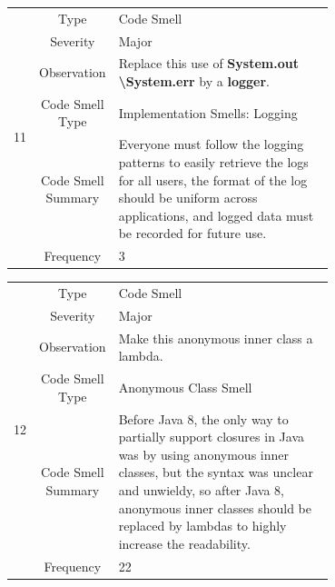\documentclass[12pt,letterpaper]{report}
\begin{document}
\begin{table}
    \begin{tabular}{|c|c|p{0.7\linewidth}|}
    \hline   
    \multirow{6}{*}{11}
        & Type & Code Smell \\
    \cline{2-3}
        & Severity & Major \\
    \cline{2-3}
       & Observation & Replace this use of \textbf{System.out \textbackslash System.err} by a \textbf{logger}. \\
    \cline{2-3}
       & Code Smell Type & Implementation Smells: Logging   \\
    \cline{2-3}
       & Code Smell Summary & Everyone must follow the logging patterns to easily retrieve the logs for all users, the format of the log should be uniform across applications, and logged data must be recorded for future use. \\
    \cline{2-3}
       & Frequency & 3 \\
    \hline
    \end{tabular}
\end{table}

\begin{table}
    \begin{tabular}{|c|c|p{0.7\linewidth}|}
    \hline   
    \multirow{6}{*}{12}
        & Type & Code Smell \\
    \cline{2-3}
        & Severity & Major \\
    \cline{2-3}
       & Observation & Make this anonymous inner class a lambda. \\
    \cline{2-3}
       & Code Smell Type & Anonymous Class Smell   \\
    \cline{2-3}
       & Code Smell Summary & Before Java 8, the only way to partially support closures in Java was by using anonymous inner classes, but the syntax was unclear and unwieldy, so after Java 8, anonymous inner classes should be replaced by lambdas to highly increase the readability. \\
    \cline{2-3}
       & Frequency & 22 \\
    \hline
    \end{tabular}
\end{table}
\end{document}
